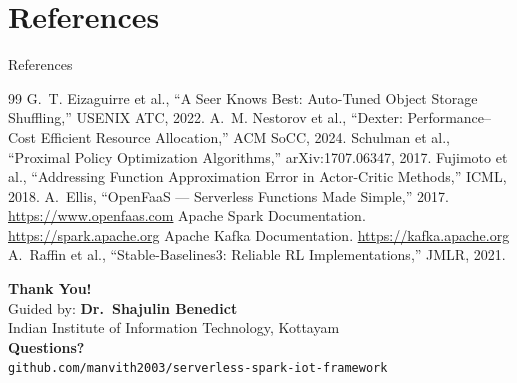 \documentclass{beamer}
\begin{document}
\section{References}

\begin{frame}[allowframebreaks]{References}
\footnotesize
\begin{thebibliography}{99}
 G.~T. Eizaguirre et al., ``A Seer Knows Best: Auto-Tuned Object Storage Shuffling,'' USENIX ATC, 2022.
 A.~M. Nestorov et al., ``Dexter: Performance--Cost Efficient Resource Allocation,'' ACM SoCC, 2024.
 Schulman et al., ``Proximal Policy Optimization Algorithms,'' arXiv:1707.06347, 2017.
 Fujimoto et al., ``Addressing Function Approximation Error in Actor-Critic Methods,'' ICML, 2018.
 A.~Ellis, ``OpenFaaS --- Serverless Functions Made Simple,'' 2017. \url{https://www.openfaas.com}
 Apache Spark Documentation. \url{https://spark.apache.org}
 Apache Kafka Documentation. \url{https://kafka.apache.org}
 A.~Raffin et al., ``Stable-Baselines3: Reliable RL Implementations,'' JMLR, 2021.
\end{thebibliography}
\end{frame}

\begin{frame}{}
\begin{center}
\vspace{1cm}
{\Large\textbf{Thank You!}}\\[0.6cm]
Guided by: \textbf{Dr.\ Shajulin Benedict}\\
Indian Institute of Information Technology, Kottayam\\[0.8cm]
\textbf{Questions?}\\[0.5cm]
\footnotesize
\texttt{github.com/manvith2003/serverless-spark-iot-framework}
\end{center}
\end{frame}
\end{document}

